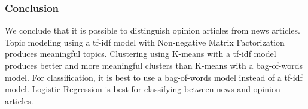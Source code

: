 \documentclass[11pt]{article}
\begin{document}
    \subsubsection{Conclusion}\label{conclusion}

We conclude that it is possible to distinguish opinion articles from
news articles. Topic modeling using a tf-idf model with Non-negative
Matrix Factorization produces meaningful topics. Clustering using
K-means with a tf-idf model produces better and more meaningful clusters
than K-means with a bag-of-words model. For classification, it is best
to use a bag-of-words model instead of a tf-idf model. Logistic
Regression is best for classifying between news and opinion articles.


    
    
    
    
\end{document}
